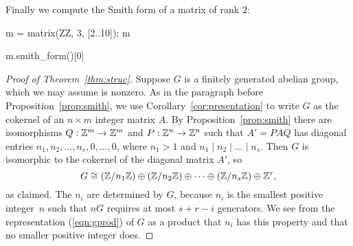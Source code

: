 \begin{example}
Finally we compute the Smith form of a matrix of rank $2$:
\begin{sagecode}
\begin{sagecell}
m = matrix(ZZ, 3, [2..10]); m
\end{sagecell}
\begin{sageout}
[ 2  3  4]
[ 5  6  7]
[ 8  9 10]
\end{sageout}
\begin{sagecell}
m.smith_form()[0]
\end{sagecell}
\begin{sageout}
[1 0 0]
[0 3 0]
[0 0 0]
\end{sageout}
\end{sagecode}
\end{example}


\begin{proof}[Proof of Theorem~\ref{thm:struc}]
	Suppose $G$ is a finitely generated abelian group, which we may assume
	is nonzero.  As in the paragraph before Proposition~\ref{prop:smith},
	we use Corollary~\ref{cor:presentation} to write $G$ as the cokernel
	of an $n\times m$ integer matrix $A$.  By Proposition~\ref{prop:smith}
	there are isomorphisms $Q:\mathbb{Z}^m\to \mathbb{Z}^m$ and $P:\mathbb{Z}^n\to \mathbb{Z}^n$ such that
	$A'=PAQ$ has diagonal entries $n_1, n_2,\ldots,
	n_s,0,\ldots,0$, where $n_1>1$ and $n_1\mid n_2 \mid{} \ldots \mid{}
	n_s$.  Then $G$ is isomorphic to the cokernel of the diagonal matrix
	$A'$, so
	\begin{equation}\label{eqn:gprod}
		G \cong (\mathbb{Z}/n_1\mathbb{Z}) \oplus (\mathbb{Z}/n_2\mathbb{Z})
		\oplus \cdots \oplus (\mathbb{Z}/n_s\mathbb{Z}) \oplus \mathbb{Z}^{r},
	\end{equation}
	as claimed.  The $n_i$ are determined by $G$, because $n_i$ is the
	smallest positive integer~$n$ such that $nG$ requires at most $s+r-i$
	generators. We see from the representation (\ref{eqn:gprod}) of $G$ as
	a product that $n_i$ has this property and that no smaller positive
	integer does.
\end{proof}

